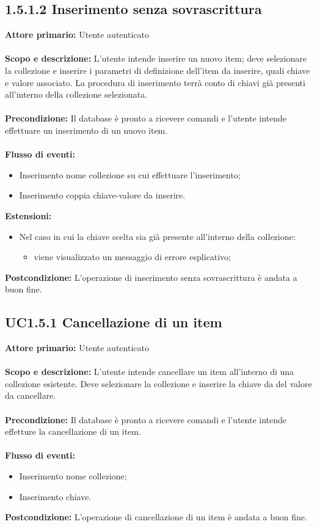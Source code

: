 \documentclass{scalatekids-article}
\begin{document}
\subsection{1.5.1.2 Inserimento senza sovrascrittura}
\textbf{Attore primario:} Utente autenticato \\ \\
\textbf{Scopo e descrizione:} L'utente intende inserire un nuovo item; deve selezionare la collezione e inserire i parametri di definizione dell'item da inserire, quali chiave e valore associato. La procedura di inserimento terrà conto di chiavi già presenti all'interno della collezione selezionata.\\ \\
\textbf{Precondizione:} Il database è pronto a ricevere comandi e l'utente intende effettuare un inserimento di un nuovo item.\\ \\
\textbf{Flusso di eventi:}
\begin{itemize}
\item Inserimento nome collezione su cui effettuare l'inserimento;
\item Inserimento coppia chiave-valore da inserire.
\end{itemize}
\textbf{Estensioni:}
\begin{itemize}
\item Nel caso in cui la chiave scelta sia già presente all'interno della collezione:
  \begin{itemize}
  \item viene visualizzato un messaggio di errore esplicativo;
  \end{itemize}
\end{itemize}
\textbf{Postcondizione:} L'operazione di inserimento senza sovrascrittura è andata a buon fine.
\subsection{UC1.5.1 Cancellazione di un item}
\textbf{Attore primario:} Utente autenticato\\ \\
\textbf{Scopo e descrizione:} L'utente intende cancellare un item all'interno di una collezione esistente. Deve selezionare la collezione e inserire la chiave da del valore da cancellare.\\ \\
\textbf{Precondizione:} Il database è pronto a ricevere comandi e l'utente intende effetture la cancellazione di un item.\\ \\
\textbf{Flusso di eventi:}
\begin{itemize}
\item Inserimento nome collezione;
\item Inserimento chiave.
\end{itemize}
\textbf{Postcondizione:} L'operazione di cancellazione di un item è andata a buon fine.
\end{document}
